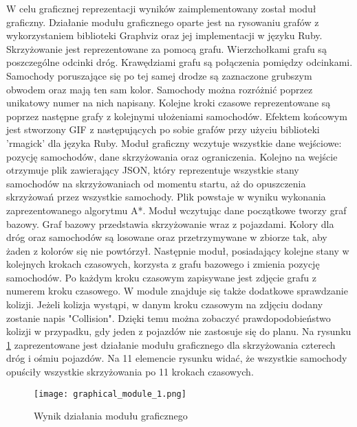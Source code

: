 W celu graficznej reprezentacji wyników zaimplementowany został moduł graficzny. Działanie modułu graficznego oparte jest na rysowaniu grafów z wykorzystaniem biblioteki Graphviz oraz jej implementacji w języku Ruby. Skrzyżowanie jest reprezentowane za pomocą grafu. Wierzchołkami grafu są poszczególne odcinki dróg. Krawędziami grafu są połączenia pomiędzy odcinkami. Samochody poruszające się po tej samej drodze są zaznaczone grubszym obwodem oraz mają ten sam kolor. Samochody można rozróżnić poprzez unikatowy numer na nich napisany. Kolejne kroki czasowe reprezentowane są poprzez następne grafy z kolejnymi ułożeniami samochodów. Efektem końcowym jest stworzony GIF z następujących po sobie grafów przy użyciu biblioteki 'rmagick' dla języka Ruby.
\newline
\indent
Moduł graficzny wczytuje wszystkie dane wejściowe: pozycję samochodów, dane skrzyżowania oraz ograniczenia. Kolejno na wejście otrzymuje plik zawierający JSON, który reprezentuje wszystkie stany samochodów na skrzyżowaniach od momentu startu, aż do opuszczenia skrzyżowań przez wszystkie samochody. Plik powstaje w wyniku wykonania zaprezentowanego algorytmu A*. Moduł wczytując dane początkowe tworzy graf bazowy. Graf bazowy przedstawia skrzyżowanie wraz z pojazdami. Kolory dla dróg oraz samochodów są losowane oraz przetrzymywane w zbiorze tak, aby żaden z kolorów się nie powtórzył. Następnie moduł, posiadający kolejne stany w kolejnych krokach czasowych, korzysta z grafu bazowego i zmienia pozycję samochodów. Po każdym kroku czasowym zapisywane jest zdjęcie grafu z numerem kroku czasowego.
\newline
\indent
W module znajduje się także dodatkowe sprawdzanie kolizji. Jeżeli kolizja wystąpi, w danym kroku czasowym na zdjęciu dodany zostanie napis "Collision". Dzięki temu można zobaczyć prawdopodobieństwo kolizji w przypadku, gdy jeden z pojazdów nie zastosuje się do planu.
\newline
\indent
Na rysunku \ref{graphical-framework} zaprezentowane jest działanie modułu graficznego dla skrzyżowania czterech dróg i ośmiu pojazdów. Na 11 elemencie rysunku widać, że wszystkie samochody opuściły wszystkie skrzyżowania po 11 krokach czasowych.
\begin{figure}
    \texttt{[image: graphical\_module\_1.png]}
  \caption{Wynik działania modułu graficznego}
  \label{graphical-framework}
\end{figure}
\newpage
